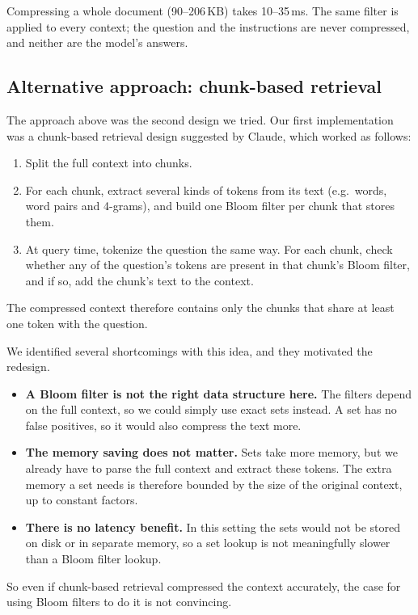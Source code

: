 \documentclass[11pt]{article}
\begin{document}
Compressing a whole document (90--206\,KB) takes 10--35\,ms. The same filter is applied to every
context; the question and the instructions are never compressed, and neither are the model's
answers.

\subsection{Alternative approach: chunk-based retrieval}
The approach above was the second design we tried. Our first implementation was a chunk-based
retrieval design suggested by Claude, which worked as follows:
\begin{enumerate}
  \item Split the full context into chunks.
  \item For each chunk, extract several kinds of tokens from its text (e.g.\ words, word pairs and
        4-grams), and build one Bloom filter per chunk that stores them.
  \item At query time, tokenize the question the same way. For each chunk, check whether any of the
        question's tokens are present in that chunk's Bloom filter, and if so, add the chunk's text to
        the context.
\end{enumerate}
The compressed context therefore contains only the chunks that share at least one token with the
question.

We identified several shortcomings with this idea, and they motivated the redesign.
\begin{itemize}
  \item \textbf{A Bloom filter is not the right data structure here.} The filters depend on the full
        context, so we could simply use exact sets instead. A set has no false positives, so it would
        also compress the text more.
  \item \textbf{The memory saving does not matter.} Sets take more memory, but we already have to
        parse the full context and extract these tokens. The extra memory a set needs is therefore
        bounded by the size of the original context, up to constant factors.
  \item \textbf{There is no latency benefit.} In this setting the sets would not be stored on disk or
        in separate memory, so a set lookup is not meaningfully slower than a Bloom filter lookup.
\end{itemize}
So even if chunk-based retrieval compressed the context accurately, the case for using Bloom filters
to do it is not convincing.
\end{document}

